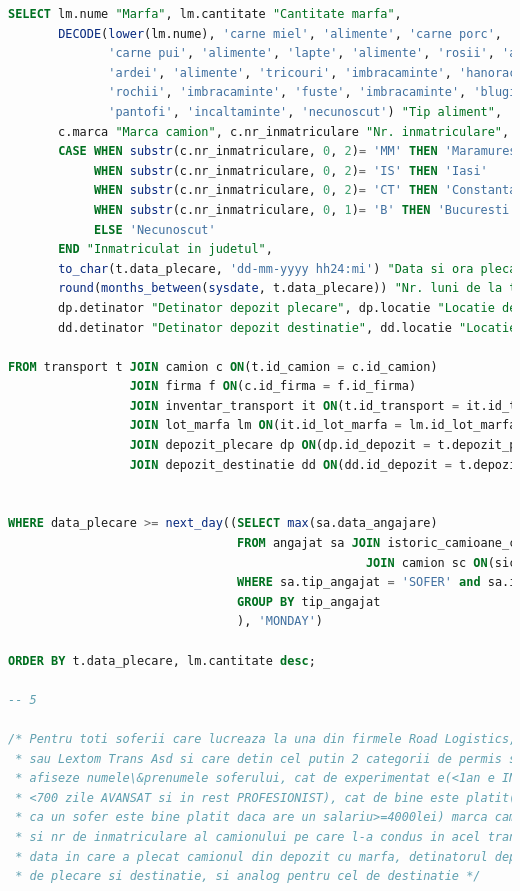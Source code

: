 \documentclass[12pt, a4paper]{article}
\begin{document}
\begin{lstlisting}[language=SQL]
SELECT lm.nume "Marfa", lm.cantitate "Cantitate marfa",
       DECODE(lower(lm.nume), 'carne miel', 'alimente', 'carne porc', 'alimente',
              'carne pui', 'alimente', 'lapte', 'alimente', 'rosii', 'alimente',
              'ardei', 'alimente', 'tricouri', 'imbracaminte', 'hanorace', 'imbracaminte',
              'rochii', 'imbracaminte', 'fuste', 'imbracaminte', 'blugi', 'imbracaminte',
              'pantofi', 'incaltaminte', 'necunoscut') "Tip aliment",
       c.marca "Marca camion", c.nr_inmatriculare "Nr. inmatriculare",
       CASE WHEN substr(c.nr_inmatriculare, 0, 2)= 'MM' THEN 'Maramures'
            WHEN substr(c.nr_inmatriculare, 0, 2)= 'IS' THEN 'Iasi'
            WHEN substr(c.nr_inmatriculare, 0, 2)= 'CT' THEN 'Constanta'
            WHEN substr(c.nr_inmatriculare, 0, 1)= 'B' THEN 'Bucuresti'
            ELSE 'Necunoscut'
       END "Inmatriculat in judetul",
       to_char(t.data_plecare, 'dd-mm-yyyy hh24:mi') "Data si ora plecare",
       round(months_between(sysdate, t.data_plecare)) "Nr. luni de la transport",
       dp.detinator "Detinator depozit plecare", dp.locatie "Locatie depozit plecare",
       dd.detinator "Detinator depozit destinatie", dd.locatie "Locatie depozit destinatie"

FROM transport t JOIN camion c ON(t.id_camion = c.id_camion)
                 JOIN firma f ON(c.id_firma = f.id_firma)
                 JOIN inventar_transport it ON(t.id_transport = it.id_transport)
                 JOIN lot_marfa lm ON(it.id_lot_marfa = lm.id_lot_marfa)
                 JOIN depozit_plecare dp ON(dp.id_depozit = t.depozit_plecare)
                 JOIN depozit_destinatie dd ON(dd.id_depozit = t.depozit_destinatie)


WHERE data_plecare >= next_day((SELECT max(sa.data_angajare)
                                FROM angajat sa JOIN istoric_camioane_conduse sic ON(sa.id_angajat = sic.id_angajat)
                                                  JOIN camion sc ON(sic.id_camion = sc.id_camion)
                                WHERE sa.tip_angajat = 'SOFER' and sa.id_firma = f.id_firma
                                GROUP BY tip_angajat
                                ), 'MONDAY')

ORDER BY t.data_plecare, lm.cantitate desc;

-- 5

/* Pentru toti soferii care lucreaza la una din firmele Road Logistics, Transibo
 * sau Lextom Trans Asd si care detin cel putin 2 categorii de permis sa se
 * afiseze numele\&prenumele soferului, cat de experimentat e(<1an e INCEPATOR,
 * <700 zile AVANSAT si in rest PROFESIONIST), cat de bine este platit(se considera
 * ca un sofer este bine platit daca are un salariu>=4000lei) marca camionului
 * si nr de inmatriculare al camionului pe care l-a condus in acel transport,
 * data in care a plecat camionul din depozit cu marfa, detinatorul depozitului
 * de plecare si destinatie, si analog pentru cel de destinatie */


\end{lstlisting}
\end{document}
